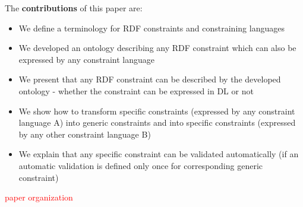 \documentclass{llncs}
\begin{document}
The \textbf{contributions} of this paper are:
\begin{itemize}
	\item We define a terminology for RDF constraints and constraining languages
	\item We developed an ontology describing any RDF constraint which can also be expressed by any constraint language
	\item We present that any RDF constraint can be described by the developed ontology - whether the constraint can be expressed in DL or not 
	\item We show how to transform specific constraints (expressed by any constraint language A) into generic constraints and into specific constraints (expressed by any other constraint language B)
  \item We explain that any specific constraint can be validated automatically (if an automatic validation is defined only once for corresponding generic constraint)
\end{itemize}


\textcolor{red}{paper organization}
\end{document}
